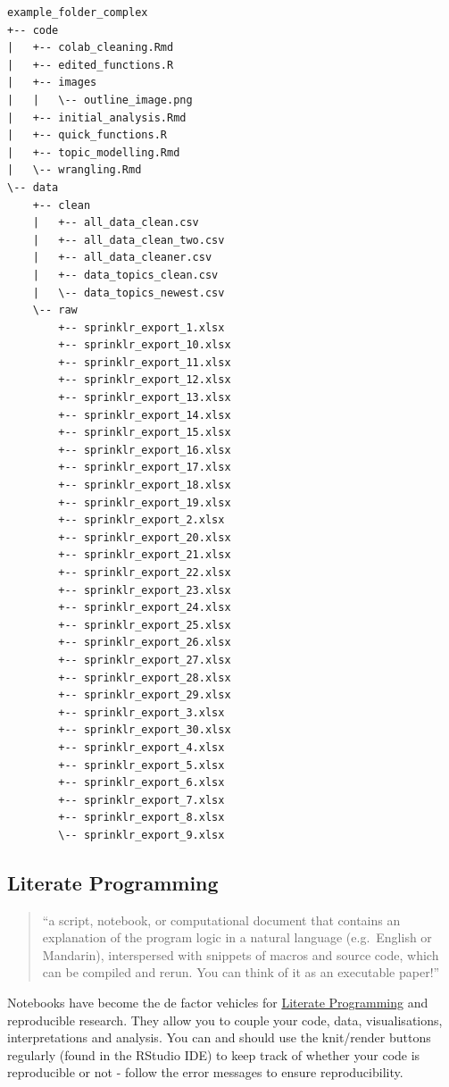 \documentclass[
  letterpaper,
  DIV=11,
  numbers=noendperiod]{scrreprt}
\begin{document}
\begin{verbatim}
example_folder_complex
+-- code
|   +-- colab_cleaning.Rmd
|   +-- edited_functions.R
|   +-- images
|   |   \-- outline_image.png
|   +-- initial_analysis.Rmd
|   +-- quick_functions.R
|   +-- topic_modelling.Rmd
|   \-- wrangling.Rmd
\-- data
    +-- clean
    |   +-- all_data_clean.csv
    |   +-- all_data_clean_two.csv
    |   +-- all_data_cleaner.csv
    |   +-- data_topics_clean.csv
    |   \-- data_topics_newest.csv
    \-- raw
        +-- sprinklr_export_1.xlsx
        +-- sprinklr_export_10.xlsx
        +-- sprinklr_export_11.xlsx
        +-- sprinklr_export_12.xlsx
        +-- sprinklr_export_13.xlsx
        +-- sprinklr_export_14.xlsx
        +-- sprinklr_export_15.xlsx
        +-- sprinklr_export_16.xlsx
        +-- sprinklr_export_17.xlsx
        +-- sprinklr_export_18.xlsx
        +-- sprinklr_export_19.xlsx
        +-- sprinklr_export_2.xlsx
        +-- sprinklr_export_20.xlsx
        +-- sprinklr_export_21.xlsx
        +-- sprinklr_export_22.xlsx
        +-- sprinklr_export_23.xlsx
        +-- sprinklr_export_24.xlsx
        +-- sprinklr_export_25.xlsx
        +-- sprinklr_export_26.xlsx
        +-- sprinklr_export_27.xlsx
        +-- sprinklr_export_28.xlsx
        +-- sprinklr_export_29.xlsx
        +-- sprinklr_export_3.xlsx
        +-- sprinklr_export_30.xlsx
        +-- sprinklr_export_4.xlsx
        +-- sprinklr_export_5.xlsx
        +-- sprinklr_export_6.xlsx
        +-- sprinklr_export_7.xlsx
        +-- sprinklr_export_8.xlsx
        \-- sprinklr_export_9.xlsx
\end{verbatim}

\subsection{Literate Programming}\label{literate-programming}

\begin{quote}
``a script, notebook, or computational document that contains an
explanation of the program logic in a natural language (e.g.~English or
Mandarin), interspersed with snippets of macros and source code, which
can be compiled and rerun. You can think of it as an executable paper!''
\end{quote}

Notebooks have become the de factor vehicles for
\href{https://guides.nyu.edu/datascience/literate-prog}{Literate
Programming} and reproducible research. They allow you to couple your
code, data, visualisations, interpretations and analysis. You can and
should use the knit/render buttons regularly (found in the RStudio IDE)
to keep track of whether your code is reproducible or not - follow the
error messages to ensure reproducibility.
\end{document}
